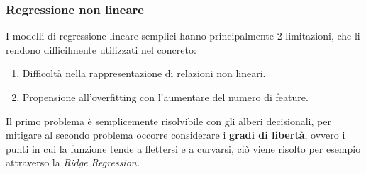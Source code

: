 \subsubsection{Regressione non lineare}
\fancyhead{}    %

I modelli di regressione lineare semplici hanno principalmente 2 limitazioni, che li
rendono difficilmente utilizzati nel concreto:
\begin{enumerate}
    \item Difficoltà nella rappresentazione di relazioni non lineari.
    \item Propensione all'overfitting con l'aumentare del numero di feature.
\end{enumerate}
Il primo problema è semplicemente risolvibile con gli alberi decisionali, per mitigare al
secondo problema occorre considerare i \textbf{gradi di libertà}, ovvero i punti in cui la funzione
tende a flettersi e a curvarsi, ciò viene risolto per esempio attraverso la \textit{Ridge Regression.}